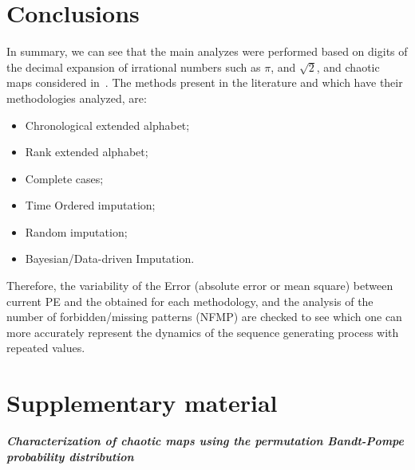 \documentclass[11pt]{article}
\begin{document}
\section*{Conclusions}

In summary, we can see that the main analyzes were performed based on digits of the decimal expansion of irrational numbers such as $\pi$, and $\sqrt{2}$, and chaotic maps considered in~\cite{rosso2013characterization}.
The methods present in the literature and which have their methodologies analyzed, are:
\begin{itemize}
    \item Chronological extended alphabet;
    \item Rank extended alphabet;
    \item Complete cases;
    \item Time Ordered imputation;
    \item Random imputation;
    \item Bayesian/Data-driven Imputation.
\end{itemize}
Therefore, the variability of the Error (absolute error or mean square) between current PE and the obtained for each methodology, and the analysis of the number of forbidden/missing patterns (NFMP) are checked to see which one can more accurately represent the dynamics of the sequence generating process with repeated values.

\section*{Supplementary material}

\textbf{\textit{Characterization of chaotic maps using the permutation
Bandt-Pompe probability distribution}}
\end{document}

